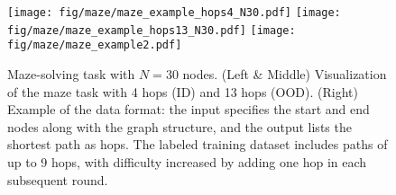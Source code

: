 \begin{figure}[ht!]
    \centering
    \texttt{[image: fig/maze/maze\_example\_hops4\_N30.pdf]}
    \hspace{1mm}
    \texttt{[image: fig/maze/maze\_example\_hops13\_N30.pdf]}
    \hspace{1mm}
    \texttt{[image: fig/maze/maze\_example2.pdf]}
    \caption{Maze-solving task with \( N=30 \) nodes. (Left \& Middle) Visualization of the maze task with 4 hops (ID) and 13 hops (OOD). (Right) Example of the data format: the input specifies the start and end nodes along with the graph structure, and the output lists the shortest path as hops. The labeled training dataset includes paths of up to 9 hops, with difficulty increased by adding one hop in each subsequent round.}
    \label{fig:maze_data}
\end{figure}



